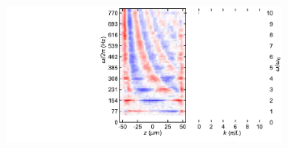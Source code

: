 \documentclass[26pt, paperwidth=36in,paperheight=48in]{tikzposter} %
\begin{document}
\begin{columns}
{\begin{minipage}{0.2\textwidth}
	\end{minipage}
	\hspace{-3cm}
	\begin{minipage}{0.13\textwidth}
		\vspace{1.7cm}
		\includegraphics[width=9cm,
		trim=5cm 0cm 5.2cm 0cm,clip]{figures/fundamental_modes_redone.pdf}
	\end{minipage}
	\hspace{-2cm}
	\vspace{0.5cm}
	
	
}

	
	
	


\end{columns}



\end{document}
